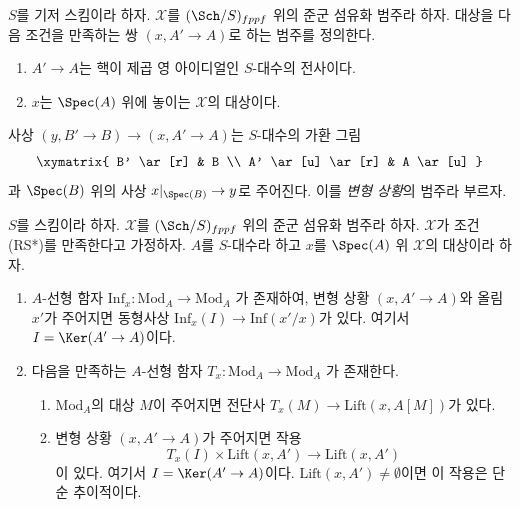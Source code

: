 \noindent
$S$를 기저 스킴이라 하자. $\mathcal{X}$를 $(\Sch/S)_{fppf}$ 위의
준군 섬유화 범주라 하자. 대상을 다음 조건을 만족하는 쌍
$(x, A' \to A)$로 하는 범주를 정의한다.
\begin{enumerate}
\item $A' \to A$는 핵이 제곱 영 아이디얼인 $S$-대수의 전사이다.
\item $x$는 $\Spec(A)$ 위에 놓이는 $\mathcal{X}$의 대상이다.
\end{enumerate}
사상 $(y, B' \to B) \to (x, A' \to A)$는 $S$-대수의 가환 그림
$$
\xymatrix{
B' \ar[r] & B \\
A' \ar[u] \ar[r] & A \ar[u]
}
$$
과 $\Spec(B)$ 위의 사상 $x|_{\Spec(B)} \to y$로 주어진다.
이를 {\it 변형 상황}의 범주라 부르자.

\begin{lemma}
\label{lemma-properties-lift-RS-star}
$S$를 스킴이라 하자. $\mathcal{X}$를 $(\Sch/S)_{fppf}$ 위의 준군
섬유화 범주라 하자. $\mathcal{X}$가 조건 (RS*)를 만족한다고 가정하자.
$A$를 $S$-대수라 하고 $x$를 $\Spec(A)$ 위 $\mathcal{X}$의 대상이라 하자.
\begin{enumerate}
\item $A$-선형 함자
$\text{Inf}_x : \text{Mod}_A \to \text{Mod}_A$
가 존재하여, 변형 상황 $(x, A' \to A)$와 올림 $x'$가 주어지면
동형사상 $\text{Inf}_x(I) \to \text{Inf}(x'/x)$가 있다.
여기서 $I = \Ker(A' \to A)$이다.
\item 다음을 만족하는 $A$-선형 함자
$T_x : \text{Mod}_A \to \text{Mod}_A$
가 존재한다.
\begin{enumerate}
\item $\text{Mod}_A$의 대상 $M$이 주어지면 전단사
$T_x(M) \to \text{Lift}(x, A[M])$가 있다.
\item 변형 상황 $(x, A' \to A)$가 주어지면 작용
$$
T_x(I) \times \text{Lift}(x, A') \to \text{Lift}(x, A')
$$
이 있다. 여기서 $I = \Ker(A' \to A)$이다.
$\text{Lift}(x, A') \not = \emptyset$이면 이 작용은 단순 추이적이다.
\end{enumerate}
\end{enumerate}
\end{lemma}

